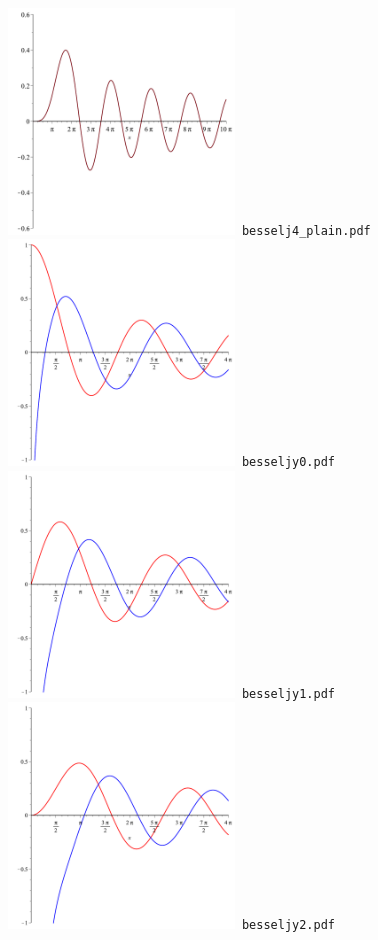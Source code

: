 \documentclass[a4paper]{amsart}
\begin{document}
\includegraphics[width=6cm]{besselj4_plain.pdf}\verb+ besselj4_plain.pdf+\\
\includegraphics[width=6cm]{besseljy0.pdf}\verb+ besseljy0.pdf+\\
\includegraphics[width=6cm]{besseljy1.pdf}\verb+ besseljy1.pdf+\\
\includegraphics[width=6cm]{besseljy2.pdf}\verb+ besseljy2.pdf+\\
\end{document}
